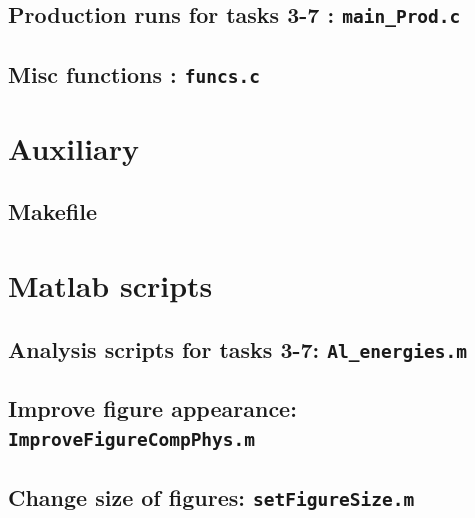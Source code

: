 \subsection{Production runs for tasks 3-7 : \texttt{main\_Prod.c}}



\subsection{Misc functions : \texttt{funcs.c}}


\section{Auxiliary }
\subsection{Makefile}




\section{Matlab scripts}
\subsection{Analysis scripts for tasks 3-7: \texttt{Al\_energies.m}}


\subsection{Improve figure appearance: \texttt{ImproveFigureCompPhys.m}}


\subsection{Change size of figures: \texttt{setFigureSize.m}}



